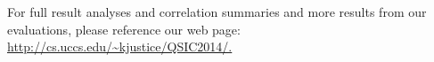 
For full result analyses and correlation summaries and more results from our evaluations, please reference our web page: \url{http://cs.uccs.edu/~kjustice/QSIC2014/.}


